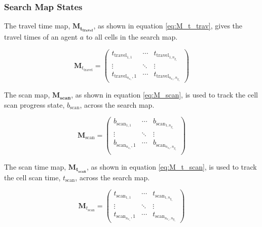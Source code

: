 \documentclass[conference]{IEEEtran}
\begin{document}
 
\subsubsection{Search Map States}

The travel time map, $\bm{M_{t_{\text{travel}}}}$, as shown in equation \ref{eq:M_t_trav}, gives the travel times of an agent $a$ to all cells in the search map.

\begin{equation}
    \label{eq:M_t_trav}
    \bm{M}_{t_{\text{travel}}} = 
    \begin{pmatrix}
        t_{\text{travel}_{1,1}} & \cdots & t_{\text{travel}_{1,n_{y_{s}}}}\\
        \vdots & \ddots & \vdots \\
        t_{\text{travel}_{n_{x_{s}}},1}& \cdots & t_{\text{travel}_{n_{x_{s}},n_{y_{s}}}}
    \end{pmatrix}
\end{equation}

The scan map, $\bm{M_{\text{scan}}}$, as shown in equation \ref{eq:M_scan}, is used to track the cell scan progress state, $b_{\text{scan}}$, across the search map.

\begin{equation}
    \label{eq:M_scan}
    \bm{M}_{\text{scan}} = 
    \begin{pmatrix}
        b_{\text{scan}_{1,1}} & \cdots & b_{\text{scan}_{1,n_{y_{s}}}}\\
        \vdots & \ddots & \vdots \\
        b_{\text{scan}_{n_{x_{s}}},1}& \cdots & b_{\text{scan}_{n_{x_{s}},n_{y_{s}}}}\\
    \end{pmatrix}
\end{equation}

The scan time map, $\bm{M_{t_{\text{scan}}}}$, as shown in equation \ref{eq:M_t_scan}, is used to track the cell scan time, $t_{\text{scan}}$, across the search map.

\begin{equation}
    \label{eq:M_t_scan}
    \bm{M}_{t_{\text{scan}}} = 
    \begin{pmatrix}
        t_{\text{scan}_{1,1}} & \cdots & t_{\text{scan}_{1,n_{y_{s}}}}\\
        \vdots & \ddots & \vdots \\
        t_{\text{scan}_{n_{x_{s}}},1}& \cdots & t_{\text{scan}_{n_{x_{s}},n_{y_{s}}}}
    \end{pmatrix}
\end{equation}
\end{document}
